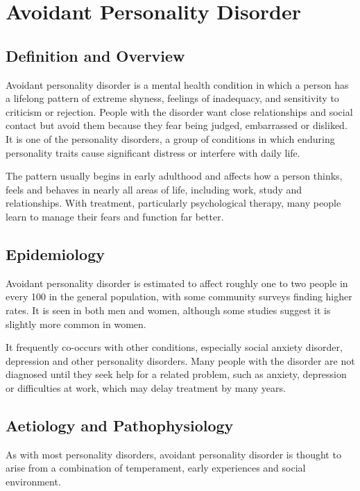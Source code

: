 \chapter{Avoidant Personality Disorder}

\section*{Definition and Overview}
Avoidant personality disorder is a mental health condition in which a person has a lifelong pattern of extreme shyness, feelings of inadequacy, and sensitivity to criticism or rejection. People with the disorder want close relationships and social contact but avoid them because they fear being judged, embarrassed or disliked. It is one of the personality disorders, a group of conditions in which enduring personality traits cause significant distress or interfere with daily life.

The pattern usually begins in early adulthood and affects how a person thinks, feels and behaves in nearly all areas of life, including work, study and relationships. With treatment, particularly psychological therapy, many people learn to manage their fears and function far better.

\section*{Epidemiology}
Avoidant personality disorder is estimated to affect roughly one to two people in every 100 in the general population, with some community surveys finding higher rates. It is seen in both men and women, although some studies suggest it is slightly more common in women.

It frequently co-occurs with other conditions, especially social anxiety disorder, depression and other personality disorders. Many people with the disorder are not diagnosed until they seek help for a related problem, such as anxiety, depression or difficulties at work, which may delay treatment by many years.

\section*{Aetiology and Pathophysiology}
As with most personality disorders, avoidant personality disorder is thought to arise from a combination of temperament, early experiences and social environment.

